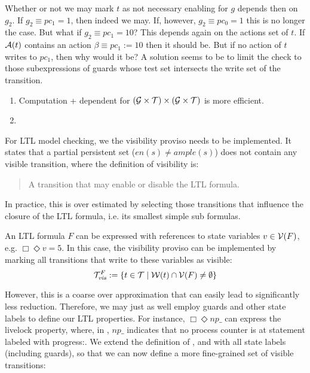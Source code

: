 \documentclass{paper}
\begin{document}
Whether or not we may mark $t$ as not necessary enabling for $g$ depends
then on $g_2$. If $g_2 \equiv pc_1 = 1$, then indeed we may. If, however,
$g_2 \equiv pc_0 = 1$ this is no longer the case.
But what if $g_2\equiv pc_1 = 10$?
This depends again on the actions set of $t$. If $\mathcal{A}(t)$
contains an action $\beta\equiv pc_1 := 10$ then it should be.
But if no action of $t$ writes to $pc_1$, then why would it be?
A solution seems to be to limit the \mce check to those subexpressions of
guards whose test set intersects the write set of the transition.


\begin{enumerate}
\item Computation \mce + dependent for
	$(\mathcal{G}\times\mathcal{T})\times(\mathcal{G}\times\mathcal{T})$ is more efficient.
\item 
\end{enumerate}


\newpage

For LTL model checking, we the visibility proviso needs to be implemented.
It states that a partial persistent set ($en(s) \neq \mathit{ample(s)}$)
does not contain any visible transition, where the definition of 
visibility is:
\begin{quote}
A transition that may enable or disable the LTL formula.
\end{quote}
In practice, this is over estimated by selecting those transitions that
influence the closure of the LTL formula, i.e. its smallest simple
sub formulas.

An LTL formula $F$ can be expressed with references to state variables
$v \in \mathcal{V}(F)$, e.g. $\Box \Diamond v = 5$.
In this case, the visibility proviso can be implemented by marking
all transitions that write to these variables as visible:
\[
\mathcal{T}^F_\mathit{vis}:=\{t\in\mathcal{T}\mid\mathcal{W}(t)\cap\mathcal{V}(F)\neq\emptyset\}
\] 

However, this is a coarse over approximation that can easily lead to
significantly less reduction. Therefore, we may just as well employ guards
and other state labels to define our LTL properties.
For instance, $\Box \Diamond \mathit{np\_}$ can express the
livelock property, where, in \promela, $\mathit{np\_}$ indicates that
no process counter is at statement labeled with \textsf{progress:}.
We extend the definition of \nes, \nds and \mce with all state labels
(including guards), so that we can now
define a more fine-grained  set of visible transitions:
\end{document}
